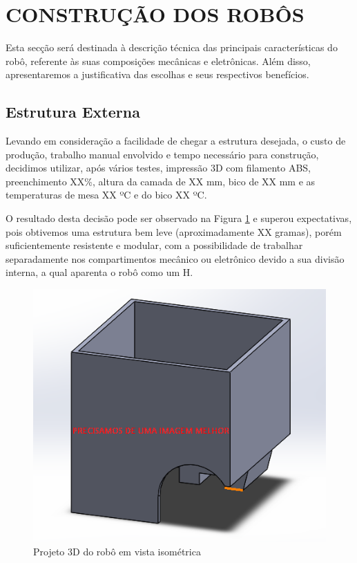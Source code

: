 \section{CONSTRUÇÃO DOS ROBÔS}\label{construction}

Esta secção será destinada à descrição técnica das principais características do robô, referente às suas composições mecânicas e eletrônicas. Além disso, apresentaremos a justificativa das escolhas e seus respectivos benefícios.

\subsection{Estrutura Externa}

Levando em consideração a facilidade de chegar a estrutura desejada, o custo de produção, trabalho manual envolvido e tempo necessário para construção, decidimos utilizar, após vários testes, impressão 3D com filamento ABS, preenchimento XX\%, altura da camada de XX mm, bico de XX mm e as temperaturas de mesa XX ºC e do bico XX ºC. 

O resultado desta decisão pode ser observado na Figura \ref{fig:visometrica} e superou expectativas, pois obtivemos uma estrutura bem leve (aproximadamente XX gramas), porém suficientemente resistente e modular, com a possibilidade de trabalhar separadamente nos compartimentos mecânico ou eletrônico devido a sua divisão interna, a qual aparenta o robô como um H.

\begin{figure}[htbp]
\centerline{\includegraphics[width=\columnwidth]{capitulos/imagens/robo_visometrica.png}}
\caption{Projeto 3D do robô em vista isométrica}
\label{fig:visometrica}
\end{figure}

